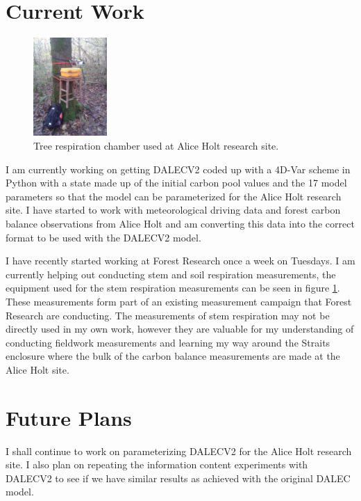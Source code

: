 \documentclass[11pt]{article}
\begin{document}
\section{Current Work}
\begin{figure}
    \includegraphics[width=0.25\textwidth]{treechamber.png}
  \caption{Tree respiration chamber used at Alice Holt research site.}
\label{stem}
\end{figure}
I am currently working on getting DALECV2 coded up with a 4D-Var scheme in Python with a state made up of the initial carbon pool values and the 17 model parameters so that the model can be parameterized for the Alice Holt research site.
I have started to work with meteorological driving data and forest carbon balance observations from Alice Holt and am converting this data into the correct format to be used with the DALECV2 model. 

I have recently started working at Forest Research once a week on Tuesdays. I am currently helping out conducting stem and soil respiration measurements, the equipment used for the stem respiration measurements can be seen in figure \ref{stem}. These measurements form part of an existing measurement campaign that Forest Research are conducting. The measurements of stem respiration may not be directly used in my own work, however they are valuable for my understanding of conducting fieldwork measurements and learning my way around the Straits enclosure where the bulk of the carbon balance measurements are made at the Alice Holt site.





\section{Future Plans}

I shall continue to work on parameterizing DALECV2 for the Alice Holt research site. I also plan on repeating the information content experiments with DALECV2 to see if we have similar results as achieved with the original DALEC model.
\end{document}
